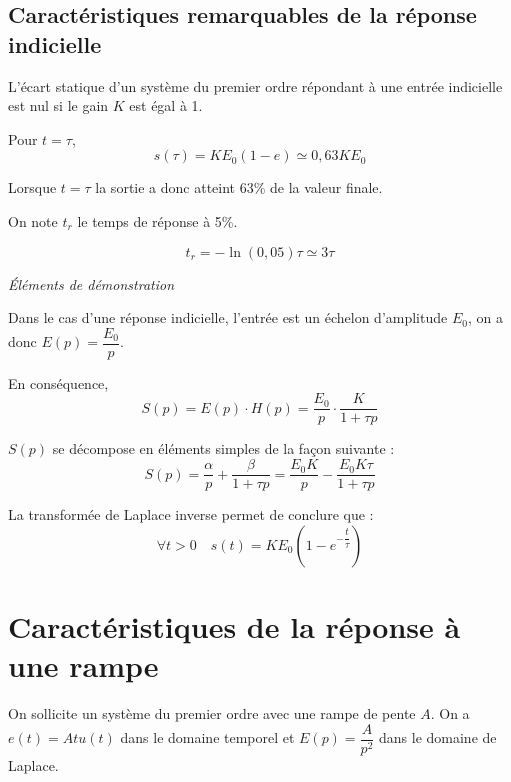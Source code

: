 \documentclass[10pt,fleqn]{article} %
\begin{document}
\subsection*{Caractéristiques remarquables de la réponse indicielle}


\begin{rem}
L'écart statique d'un système du premier ordre répondant à une entrée
indicielle est nul si le gain $K$ est égal à 1.
\end{rem}


\begin{resultat}
Pour $t=\tau$, 
$$
s(\tau)=KE_0 (1-e)\simeq 0,63 KE_0
$$

Lorsque $t=\tau$ la sortie a donc atteint 63\% de la valeur finale.
\end{resultat}

\begin{resultat}
On note $t_r$ le temps de réponse à 5\%.

$$ t_r = - \ln \left(0,05\right) \tau \simeq 3\tau
$$

\end{resultat}



\begin{demo}
\textit{Éléments de démonstration}


Dans le cas d'une réponse indicielle, l'entrée est un échelon d'amplitude $E_0$, on a donc $E(p)=\dfrac{E_0}{p}$. 

En conséquence, 
$$
S(p)=E(p)\cdot H(p) = \dfrac{E_0}{p} \cdot \dfrac{K}{1+\tau p}
$$

$S(p)$ se décompose en éléments simples de la façon suivante :
$$
S(p)= \dfrac{\alpha}{p} + \dfrac{\beta}{1+\tau p} = \dfrac{E_0 K}{p}- \dfrac{E_0 K \tau}{1+\tau p}
$$

La transformée de Laplace inverse permet de conclure que :
$$
\forall t>0  \quad s(t)=KE_0 \left( 1-e^{-\dfrac{t}{\tau}}\right)
$$

\end{demo}

\section{Caractéristiques de la réponse à une rampe}
On sollicite un système du premier ordre avec une rampe de pente $A$.
On a $e(t)=Atu(t)$ dans le domaine temporel et $E(p)=\dfrac{A}{p^2}$ dans le domaine de Laplace.
\end{document}
